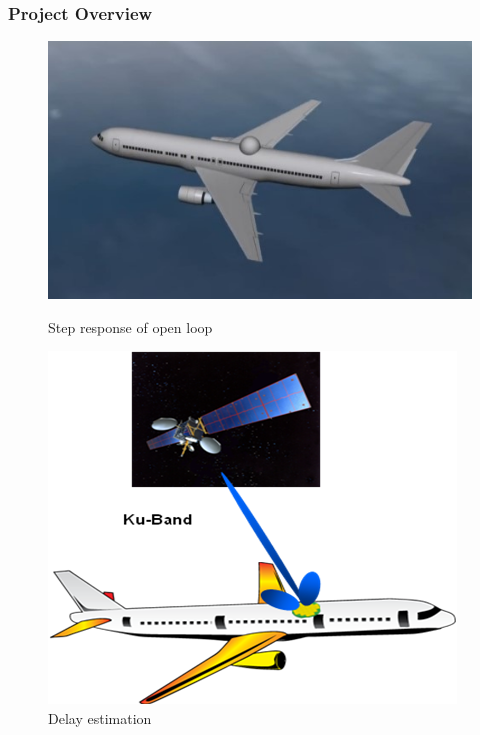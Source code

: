\documentclass{beamer}
\begin{document}
\begin{frame}\frametitle{Project Overview}
	
	\begin{figure}[H]
	\begin{minipage}[t]{0.45\textwidth}
	\centering
	\includegraphics[width=\linewidth]{images/past_antenna}
	\caption{Step response of open loop}
	\label{fig:bandwidth1}
	\end{minipage}
	\hspace{\fill}
	\begin{minipage}[t]{0.45\textwidth}
	\centering
	\includegraphics[width=\linewidth]{images/satrax_plane}
	\caption{Delay estimation}
	\label{fig:bandwidth2}
	
	\end{minipage}
	\end{figure}
	
\end{frame}
\end{document}
